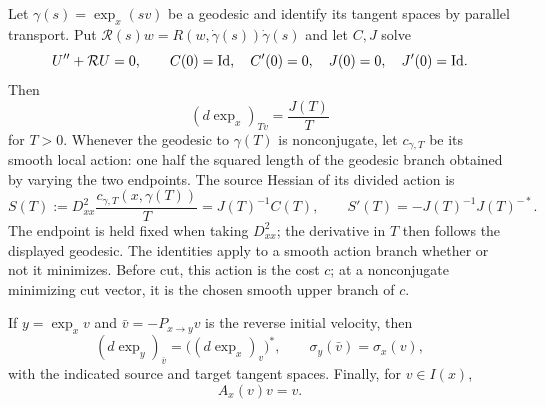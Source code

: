 \begin{lemma}\label{spec:identities}
Let $\gamma(s)=\exp_x(sv)$ be a geodesic and identify its tangent spaces
by parallel transport.  Put $\mathcal R(s)w=R(w,\dot\gamma(s))\dot\gamma(s)$
and let $C,J$ solve
\[
  U''+\mathcal R U=0,
  \qquad C(0)=\mathrm{Id},\quad C'(0)=0,\quad
  J(0)=0,\quad J'(0)=\mathrm{Id}.
\]
Then
\begin{equation}\label{spec:exp-jacobi}
  (d\exp_x)_{Tv}=\frac{J(T)}{T}
\end{equation}
for $T>0$. Whenever the geodesic to $\gamma(T)$ is nonconjugate,
let $c_{\gamma,T}$ be its smooth local action: one half the squared
length of the geodesic branch obtained by varying the two endpoints.
The source Hessian of its divided action is
\begin{equation}\label{spec:divided-hessian}
  S(T):=D^2_{xx}\frac{c_{\gamma,T}(x,\gamma(T))}{T}
       =J(T)^{-1}C(T),
  \qquad
  S'(T)=-J(T)^{-1}J(T)^{-*}.
\end{equation}
The endpoint is held fixed when taking $D^2_{xx}$; the derivative in $T$
then follows the displayed geodesic.  The identities apply to a smooth
action branch whether or not it minimizes. Before cut, this action is
the cost $c$; at a nonconjugate minimizing cut vector, it is the chosen
smooth upper branch of $c$.

If $y=\exp_xv$ and $\bar v=-P_{x\to y}v$ is the reverse initial velocity,
then
\begin{equation}\label{spec:reversal}
  (d\exp_y)_{\bar v}=\bigl((d\exp_x)_v\bigr)^*,
  \qquad \sigma_y(\bar v)=\sigma_x(v),
\end{equation}
with the indicated source and target tangent spaces.  Finally, for
$v\in I(x)$,
\begin{equation}\label{spec:radial-identity}
  A_x(v)v=v.
\end{equation}
\end{lemma}

